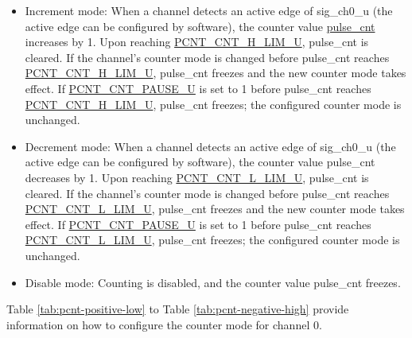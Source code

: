 \documentclass[main\_\_EN.tex]{subfiles}
\begin{document}
\begin{itemize}
\item Increment mode: When a channel detects an active edge of sig\_ch0\_u (the active edge can be configured by software), the counter value \hyperref[fielddesc:PCNTPULSECNTUN]{pulse\_cnt} increases by 1. Upon reaching \hyperref[fielddesc:PCNTCNTHLIMUN]{PCNT\_CNT\_H\_LIM\_U}, pulse\_cnt is cleared. If the channel's counter mode is changed before pulse\_cnt reaches \hyperref[fielddesc:PCNTCNTHLIMUN]{PCNT\_CNT\_H\_LIM\_U}, pulse\_cnt freezes and the new counter mode takes effect. If \hyperref[fielddesc:PCNTCNTPAUSEUN]{PCNT\_CNT\_PAUSE\_U} is set to 1 before pulse\_cnt reaches \hyperref[fielddesc:PCNTCNTHLIMUN]{PCNT\_CNT\_H\_LIM\_U}, pulse\_cnt freezes; the configured counter mode is unchanged.

\item Decrement mode: When a channel detects an active edge of sig\_ch0\_u (the active edge can be configured by software), the counter value pulse\_cnt decreases by 1. Upon reaching \hyperref[fielddesc:PCNTCNTLLIMUN]{PCNT\_CNT\_L\_LIM\_U}, pulse\_cnt is cleared. If the channel's counter mode is changed before pulse\_cnt reaches \hyperref[fielddesc:PCNTCNTLLIMUN]{PCNT\_CNT\_L\_LIM\_U}, pulse\_cnt freezes and the new counter mode takes effect. If \hyperref[fielddesc:PCNTCNTPAUSEUN]{PCNT\_CNT\_PAUSE\_U} is set to 1 before pulse\_cnt reaches \hyperref[fielddesc:PCNTCNTLLIMUN]{PCNT\_CNT\_L\_LIM\_U}, pulse\_cnt freezes; the configured counter mode is unchanged.

\item Disable mode: Counting is disabled, and the counter value pulse\_cnt freezes.
\end{itemize}


Table \ref{tab:pcnt-positive-low} \textit{} to Table \ref{tab:pcnt-negative-high} \textit{} provide information on how to configure the counter mode for channel 0.
\end{document}
